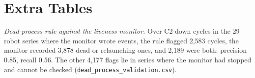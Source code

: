 \section{Extra Tables}
\label{app:tables}

\begin{table}[h]
\caption{Dead-Process Contamination by Terrain (6,760 of 54,572 rows, 12.4\,\%)}
\label{tab:a1}
\centering\small

\end{table}

\begin{table}[h]
\caption{Forecast Horizon Sweep, Censored Onset Population, Pooled Over Held-Out Terrains}
\label{tab:a2}
\centering\small

\end{table}

\begin{table}[h]
\caption{Risk Planner Versus the Repositioning Baseline of~\cite{makhubela2026satnac}, With a Same-Policy Null Control (Geometry-Matched, 95\,\% CI)}
\label{tab:a3}
\centering\footnotesize\setlength{\tabcolsep}{3pt}

\end{table}

\begin{table}[h]
\caption{Offline Altitude Bench, Fresh Seeds: Learner Minus Fixed 40\,m (Reward Points)}
\label{tab:a4}
\centering\footnotesize\setlength{\tabcolsep}{3pt}

\end{table}

\begin{table}[h]
\caption{Forest Patrol, First 30\,min, Hover at 40\,m, Same Seed}
\label{tab:a5}
\centering\small

\end{table}

\begin{table}[h]
\caption{C2 Outage Lengths, Like-for-Like Arms Without and With the Cap (One 90-min Run Each)}
\label{tab:a6}
\centering\footnotesize\setlength{\tabcolsep}{3pt}

\end{table}

\textit{Dead-process rule against the liveness monitor.} Over C2-down cycles in
the 29 robot series where the monitor wrote events, the rule flagged 2,583
cycles, the monitor recorded 3,878 dead or relaunching ones, and 2,189 were
both: precision 0.85, recall 0.56. The other 4,177 flags lie in series where the
monitor had stopped and cannot be checked (\texttt{dead\_process\_validation.csv}).

